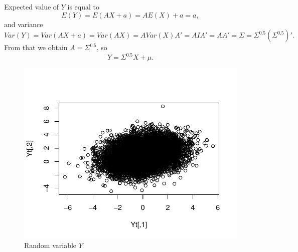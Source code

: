 \documentclass[12pt, a4paper]{article}\usepackage[]{graphicx}\usepackage[]{color}
\makeatletter
\def\maxwidth{ %
  \ifdim\Gin@nat@width>\linewidth
    \linewidth
  \else
    \Gin@nat@width
  \fi
}
\newenvironment{kframe}{%
 \def\at@end@of@kframe{}%
 \ifinner\ifhmode%
  \def\at@end@of@kframe{\end{minipage}}%
  \begin{minipage}{\columnwidth}%
 \fi\fi%
 \def\FrameCommand##1{\hskip\@totalleftmargin \hskip-\fboxsep
 \colorbox{shadecolor}{##1}\hskip-\fboxsep
     \hskip-\linewidth \hskip-\@totalleftmargin \hskip\columnwidth}%
 \MakeFramed {\advance\hsize-\width
   \@totalleftmargin\z@ \linewidth\hsize
   \@setminipage}}%
 {\par\unskip\endMakeFramed%
 \at@end@of@kframe}
\newenvironment{knitrout}{}{} %
\makeatother
\begin{document}
Expected value of $Y$ is equal to
\[E(Y) = E(AX+a) = A E(X)+a = a, \]
and variance
\[Var(Y) = Var(AX+a) = Var(AX) = A Var(X) A' = A I A' = A A' = \Sigma = \Sigma^{0.5} \left(\Sigma^{0.5}\right)'. \]
From that we obtain $A = \Sigma^{0.5}$, so 
\[ Y = \Sigma^{0.5}X + \mu.  \]

\begin{knitrout}
\color{fgcolor}\begin{figure}[H]

{\centering \includegraphics[width=\maxwidth]{figure/ex2Y-1} 

}

\caption[Random variable $Y$]{Random variable $Y$}\label{fig:ex2Y}
\end{figure}


\end{knitrout}

\begin{knitrout}
\color{fgcolor}\begin{kframe}


{\ttfamily\noindent\bfseries{}}\end{kframe}
\end{knitrout}
\end{document}
